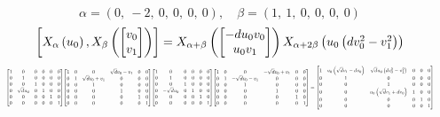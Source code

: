 \documentclass[11pt]{article}
\theoremstyle{definition}
\begin{document}
\[
\alpha = \left( 0, \  -2, \  0, \  0, \  0, \  0\right), \quad \beta = \left( 1, \  1, \  0, \  0, \  0, \  0\right)
\]
\[
\scaletoalign{\textwidth}{\left[ X_{\alpha}\left(u_{0}\right), X_{\beta}\left(\left[\begin{matrix}v_{0}\\v_{1}\end{matrix}\right]\right) \right] = X_{\alpha + \beta}\left(\left[\begin{matrix}- d u_{0} v_{0}\\u_{0} v_{1}\end{matrix}\right]\right) X_{\alpha + 2\beta}\left(u_{0} \left(d v_{0}^{2} - v_{1}^{2}\right)\right)}
\]
\[
\scaletoalign{\textwidth}{{\left[\begin{matrix}1 & 0 & 0 & 0 & 0 & 0\\0 & 1 & 0 & 0 & 0 & 0\\0 & 0 & 1 & 0 & 0 & 0\\0 & \sqrt{d} u_{0} & 0 & 1 & 0 & 0\\0 & 0 & 0 & 0 & 1 & 0\\0 & 0 & 0 & 0 & 0 & 1\end{matrix}\right]} {\left[\begin{matrix}1 & 0 & 0 & \sqrt{d} v_{0} - v_{1} & 0 & 0\\0 & 1 & \sqrt{d} v_{0} + v_{1} & 0 & 0 & 0\\0 & 0 & 1 & 0 & 0 & 0\\0 & 0 & 0 & 1 & 0 & 0\\0 & 0 & 0 & 0 & 1 & 0\\0 & 0 & 0 & 0 & 0 & 1\end{matrix}\right]} {\left[\begin{matrix}1 & 0 & 0 & 0 & 0 & 0\\0 & 1 & 0 & 0 & 0 & 0\\0 & 0 & 1 & 0 & 0 & 0\\0 & - \sqrt{d} u_{0} & 0 & 1 & 0 & 0\\0 & 0 & 0 & 0 & 1 & 0\\0 & 0 & 0 & 0 & 0 & 1\end{matrix}\right]} {\left[\begin{matrix}1 & 0 & 0 & - \sqrt{d} v_{0} + v_{1} & 0 & 0\\0 & 1 & - \sqrt{d} v_{0} - v_{1} & 0 & 0 & 0\\0 & 0 & 1 & 0 & 0 & 0\\0 & 0 & 0 & 1 & 0 & 0\\0 & 0 & 0 & 0 & 1 & 0\\0 & 0 & 0 & 0 & 0 & 1\end{matrix}\right]} = {\left[\begin{matrix}1 & u_{0} \left(\sqrt{d} v_{1} - d v_{0}\right) & \sqrt{d} u_{0} \left(d v_{0}^{2} - v_{1}^{2}\right) & 0 & 0 & 0\\0 & 1 & 0 & 0 & 0 & 0\\0 & 0 & 1 & 0 & 0 & 0\\0 & 0 & u_{0} \left(\sqrt{d} v_{1} + d v_{0}\right) & 1 & 0 & 0\\0 & 0 & 0 & 0 & 1 & 0\\0 & 0 & 0 & 0 & 0 & 1\end{matrix}\right]}}
\]
\end{document}

